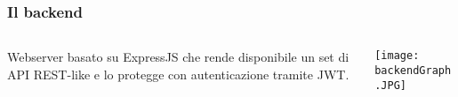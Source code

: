 \begin{frame}
  \frametitle{Il backend}
  \begin{columns}
    \begin{column}{0.4\textwidth}
      Webserver basato su ExpressJS che rende disponibile un set di API REST-like e lo protegge con autenticazione tramite JWT.
    \end{column}
    \begin{column}{0.6\textwidth}
      \texttt{[image: backendGraph.JPG]}
    \end{column}	
  \end{columns}
\end{frame}
